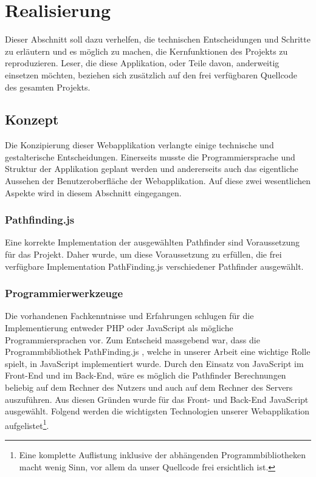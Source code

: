 \chapter{Realisierung}
Dieser Abschnitt soll dazu verhelfen, die technischen Entscheidungen und Schritte zu erläutern und es möglich zu machen, die Kernfunktionen des Projekts zu reproduzieren. Leser, die diese Applikation, oder Teile davon, anderweitig einsetzen möchten, beziehen sich zusätzlich auf den frei verfügbaren Quellcode\cite{bma} des gesamten Projekts.
\section{Konzept}
Die Konzipierung dieser Webapplikation verlangte einige technische und gestalterische Entscheidungen. 
Einerseits musste die Programmiersprache und Struktur der Applikation geplant werden und andererseits auch das eigentliche Aussehen der Benutzeroberfläche der Webapplikation. 
Auf diese zwei wesentlichen Aspekte wird in diesem Abschnitt eingegangen.
\subsection{Pathfinding.js}
Eine korrekte Implementation der ausgewählten Pathfinder sind Voraussetzung für das Projekt. 
Daher wurde, um diese Voraussetzung zu erfüllen, die frei verfügbare Implementation PathFinding.js \cite{pfjs} verschiedener Pathfinder ausgewählt.
\subsection{Programmierwerkzeuge}
Die vorhandenen Fachkenntnisse und Erfahrungen schlugen für die Implementierung entweder PHP oder JavaScript als mögliche Programmiersprachen vor. 
Zum Entscheid massgebend war, dass die Programmbibliothek PathFinding.js \cite{pfjs}, welche in unserer Arbeit eine wichtige Rolle spielt, in JavaScript implementiert wurde. 
Durch den Einsatz von JavaScript im Front-End und im Back-End, wäre es möglich die Pathfinder Berechnungen beliebig auf dem Rechner des Nutzers und auch auf dem Rechner des Servers auszuführen. Aus diesen Gründen wurde für das Front- und Back-End JavaScript ausgewählt.
Folgend werden die wichtigsten Technologien unserer Webapplikation aufgelistet\footnote{Eine komplette Auflistung inklusive der abhängenden Programmbibliotheken macht wenig Sinn, vor allem da unser Quellcode frei ersichtlich ist.}.

